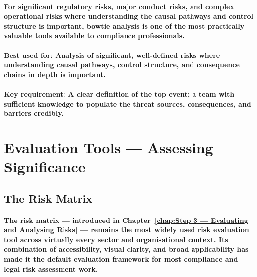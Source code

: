 \paragraph{For significant regulatory risks, major conduct risks, and complex operational risks where understanding the causal pathways and control structure is important, bowtie analysis is one of the most practically valuable tools available to compliance professionals.}
\paragraph{\textbf{Best used for}: Analysis of significant, well-defined risks where understanding causal pathways, control structure, and consequence chains in depth is important.}
\paragraph{\textbf{Key requirement}: A clear definition of the top event; a team with sufficient knowledge to populate the threat sources, consequences, and barriers credibly.}

\section{Evaluation Tools — Assessing Significance}

\subsection{The Risk Matrix}
\paragraph{The \textbf{risk matrix} — introduced in Chapter~\ref{chap:Step 3 — Evaluating and Analysing Risks} — remains the most widely used risk evaluation tool across virtually every sector and organisational context. Its combination of accessibility, visual clarity, and broad applicability has made it the default evaluation framework for most compliance and legal risk assessment work.}
